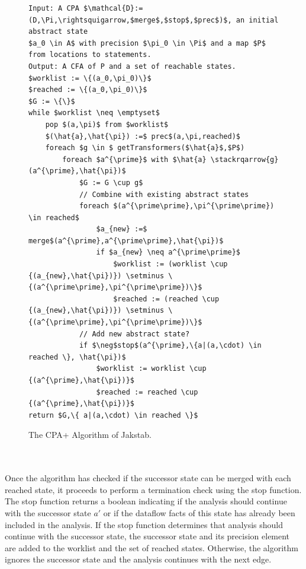 \documentclass{kththesis}
\newcommand\stackrqarrow[1]{%
    \mathrel{\stackon[2pt]{$\rightsquigarrow$}{$\scriptscriptstyle#1$}}}
\begin{document}
\begin{figure}[!htb]
\begin{minipage}{\textwidth}
    \centering
\begin{algorithmFrame}
\begin{lstlisting}[style=algorithm]
Input: A CPA $\mathcal{D}:=(D,\Pi,\rightsquigarrow,$merge$,$stop$,$prec$)$, an initial abstract state
$a_0 \in A$ with precision $\pi_0 \in \Pi$ and a map $P$ from locations to statements.
Output: A CFA of P and a set of reachable states.
$worklist := \{(a_0,\pi_0)\}$
$reached := \{(a_0,\pi_0)\}$
$G := \{\}$
while $worklist \neq \emptyset$
    pop $(a,\pi)$ from $worklist$
    $(\hat{a},\hat{\pi}) :=$ prec$(a,\pi,reached)$
    foreach $g \in $ getTransformers($\hat{a}$,$P$)
        foreach $a^{\prime}$ with $\hat{a} \stackrqarrow{g} (a^{\prime},\hat{\pi})$
            $G := G \cup g$
            // Combine with existing abstract states
            foreach $(a^{\prime\prime},\pi^{\prime\prime}) \in reached$
                $a_{new} :=$ merge$(a^{\prime},a^{\prime\prime},\hat{\pi})$
                if $a_{new} \neq a^{\prime\prime}$
                    $worklist := (worklist \cup {(a_{new},\hat{\pi})}) \setminus \{(a^{\prime\prime},\pi^{\prime\prime})\}$
                    $reached := (reached \cup {(a_{new},\hat{\pi})}) \setminus \{(a^{\prime\prime},\pi^{\prime\prime})\}$
            // Add new abstract state?
            if $\neg$stop$(a^{\prime},\{a|(a,\cdot) \in reached \}, \hat{\pi})$
                $worklist := worklist \cup {(a^{\prime},\hat{\pi})}$
                $reached := reached \cup {(a^{\prime},\hat{\pi})}$
return $G,\{ a|(a,\cdot) \in reached \}$
\end{lstlisting}
\end{algorithmFrame}
\caption[The CPA+ Algorithm of Jakstab.]{The CPA+ Algorithm of Jakstab\footnotemark.}
\label{fig:CPAJakstab}
\end{minipage}
\end{figure}
\\ \\
Once the algorithm has checked if the successor state can be merged with each reached state, it proceeds to perform a termination check using the stop function. The stop function returns a boolean indicating if the analysis should continue with the successor state $a{'}$ or if the dataflow facts of this state has already been included in the analysis. If the stop function determines that analysis should continue with the successor state, the successor state and its precision element are added to the worklist and the set of reached states. Otherwise, the algorithm ignores the successor state and the analysis continues with the next edge. 
\end{document}
